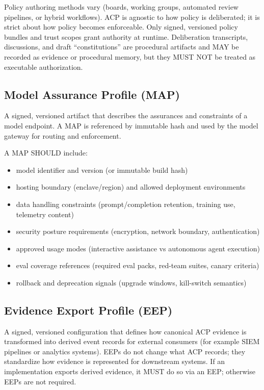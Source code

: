\documentclass[11pt]{article}
\begin{document}
Policy authoring methods vary (boards, working groups, automated review
pipelines, or hybrid workflows). ACP is agnostic to how policy is
deliberated; it is strict about how policy becomes enforceable. Only
signed, versioned policy bundles and trust scopes grant authority at
runtime. Deliberation transcripts, discussions, and draft
``constitutions'' are procedural artifacts and MAY be recorded as
evidence or procedural memory, but they MUST NOT be treated as
executable authorization.

\hypertarget{model-assurance-profile-map}{%
\subsection{Model Assurance Profile (MAP)}\label{model-assurance-profile-map}}

A signed, versioned artifact that describes the assurances and
constraints of a model endpoint. A MAP is referenced by immutable hash
and used by the model gateway for routing and enforcement.

A MAP SHOULD include:

\begin{itemize}
\tightlist
\item
  model identifier and version (or immutable build hash)
\item
  hosting boundary (enclave/region) and allowed deployment environments
\item
  data handling constraints (prompt/completion retention, training use,
  telemetry content)
\item
  security posture requirements (encryption, network boundary,
  authentication)
\item
  approved usage modes (interactive assistance vs autonomous agent
  execution)
\item
  eval coverage references (required eval packs, red-team suites, canary
  criteria)
\item
  rollback and deprecation signals (upgrade windows, kill-switch
  semantics)
\end{itemize}

\hypertarget{evidence-export-profile-eep}{%
\subsection{Evidence Export Profile (EEP)}\label{evidence-export-profile-eep}}

A signed, versioned configuration that defines how canonical ACP
evidence is transformed into derived event records for external
consumers (for example SIEM pipelines or analytics systems). EEPs do not
change what ACP records; they standardize how evidence is represented
for downstream systems. If an implementation exports derived evidence,
it MUST do so via an EEP; otherwise EEPs are not required.
\end{document}
